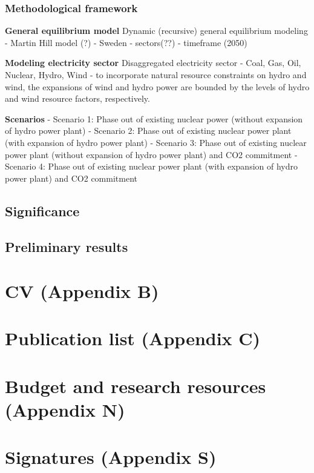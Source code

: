 \documentclass[10pt,a4paper]{article}
\begin{document}
\subsubsection{Methodological framework}
\textbf{General equilibrium model}
Dynamic (recursive) general equilibrium modeling
- Martin Hill model (?)
- Sweden
- sectors(??)
- timeframe (2050)

\textbf{Modeling electricity sector}
Disaggregated electricity sector
- Coal, Gas, Oil, Nuclear, Hydro, Wind
- to incorporate natural resource constraints on hydro and wind, the expansions of wind and hydro power are bounded by the levels of hydro and wind resource factors, respectively.

\textbf{Scenarios}
- Scenario 1: Phase out of existing nuclear power (without expansion of hydro power plant)
- Scenario 2: Phase out of existing nuclear power plant (with expansion of hydro power plant)
- Scenario 3: Phase out of existing nuclear power plant (without expansion of hydro power plant) and CO2 commitment
- Scenario 4: Phase out of existing nuclear power plant (with expansion of hydro power plant) and CO2 commitment


\subsection{Significance}

\subsection{Preliminary results}


\section{CV (Appendix B)}
\section{Publication list (Appendix C)}
\section{Budget and research resources (Appendix N)}
\section{Signatures (Appendix S)}



\pagebreak
{}


\end{document}
